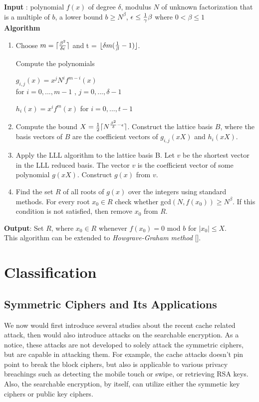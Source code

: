 \documentclass[a4paper]{article}
\begin{document}
\textbf{Input} : polynomial $f(x)$ of degree $\delta$, modulus $N$ of unknown factorization that is a multiple of $b$, a lower bound $b \geq N^{\beta}$, $\epsilon \leq {1 \over \gamma} \beta$ where $0<\beta \leq 1$
\\

\textbf{Algorithm}
\begin{enumerate}[label=(\roman*)]
      \item Choose $m=\lceil {\beta^2 \over \delta \epsilon} \rceil$ and t = $\lfloor \delta m ({1 \over \beta}-1) \rfloor$. 
      
      Compute the polynomials 
      
      $g_{i,j} (x) = x^j N^i f^{m-i} (x)$ \\ for $i=0,...,m-1$ ,  $j=0,...,\delta-1$
      
      $h_i(x) = x^i f^m (x)$ for $i=0,...,t-1$
      \item Compute the bound $ X= {1 \over 2} \lceil N^{{\beta^2 \over \delta} - \epsilon} \rceil$. Construct the lattice basis $B$, where the basis vectors of $B$ are the coefficient vectors of $g_{i,j}(xX)$ and $h_i(xX)$.
      \item Apply the LLL algorithm to the lattice basis B. Let $v$ be the shortest vector in the LLL reduced basis. The vector $v$ is the coefficient vector of some polynomial $g(xX)$. Construct $g(x)$ from $v$.
      \item Find the set $R$ of all roots of $g(x)$ over the integers using standard methods. For every root $x_0 \in R$ check whether gcd$(N,f(x_0)) \geq N^{\beta}$. If this condition is not satisfied, then remove $x_0$ from $R$.
\end{enumerate} 

\textbf{Output}: Set $R$, where $x_0 \in R$ whenever $f(x_0)=0$ mod $b$ for $|x_0| \leq X$.
\\

This algorithm can be extended to \textit{Howgrave-Graham method} [].


\section{Classification}

\subsection{Symmetric Ciphers and Its Applications}

We now would first introduce several studies about the recent cache related attack, then would also introduce attacks on the searchable encryption. As a notice, these attacks are not developed to solely attack the symmetric ciphers, but are capable in attacking them. For example, the cache attacks doesn't pin point to break the block ciphers, but also is applicable to various privacy breachings such as detecting the mobile touch or swipe, or retrieving RSA keys. Also, the searchable encryption, by itself, can utilize either the symmetic key ciphers or public key ciphers.
\end{document}
